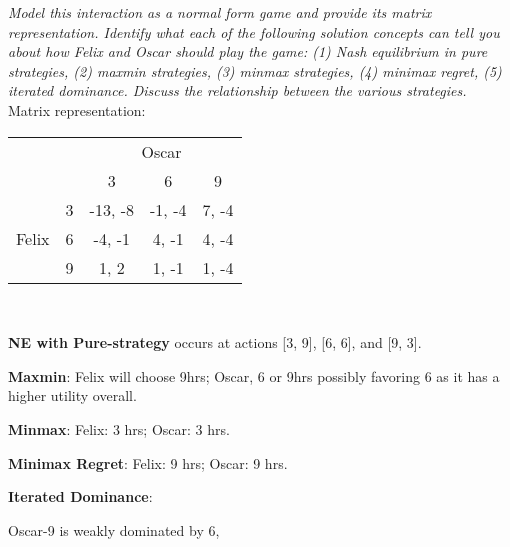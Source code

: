 \documentclass[12pt]{amsart}
\begin{document}
\textit{Model this interaction as a normal form game and provide its matrix representation.
	Identify what each of the following solution concepts can tell you about how Felix and Oscar
	should play the game: (1) Nash equilibrium in pure strategies, (2) maxmin strategies, (3)
	minmax strategies, (4) minimax regret, (5) iterated dominance. Discuss the relationship
	between the various strategies.} \\
	
	Matrix representation: \\
	
	\begin{center}
		\def\arraystretch{1.25}%
		\begin{tabular}{ccccc}
			&                        & \multicolumn{3}{c}{Oscar}                                                               \\
			& \multicolumn{1}{c|}{}  & \multicolumn{1}{c|}{3}       & \multicolumn{1}{c|}{6}      & \multicolumn{1}{c|}{9}     \\ \cline{2-5} 
			\multirow{3}{*}{Felix} & \multicolumn{1}{c|}{3} & \multicolumn{1}{c|}{-13, -8} & \multicolumn{1}{c|}{-1, -4} & \multicolumn{1}{c|}{7, -4} \\ \cline{2-5} 
			& \multicolumn{1}{c|}{6} & \multicolumn{1}{c|}{-4, -1}  & \multicolumn{1}{c|}{4, -1}  & \multicolumn{1}{c|}{4, -4} \\ \cline{2-5} 
			& \multicolumn{1}{c|}{9} & \multicolumn{1}{c|}{1, 2}    & \multicolumn{1}{c|}{1, -1}  & \multicolumn{1}{c|}{1, -4} \\ \cline{2-5} 
		\end{tabular} \\[3ex]
	\end{center}
	
	\textbf{NE with Pure-strategy} occurs at actions [3, 9], [6, 6], and [9, 3].
	
	\textbf{Maxmin}:
	Felix will choose 9hrs;	
	Oscar, 6 or 9hrs possibly favoring 6 as it has a higher utility overall.
	
	\textbf{Minmax}:
	Felix: 3 hrs; 
	Oscar: 3 hrs.
	
	\textbf{Minimax Regret}:
	Felix: 9 hrs;
	Oscar: 9 hrs.
	
	\textbf{Iterated Dominance}:
	
	Oscar-9 is weakly dominated by 6,
	
\end{document}
